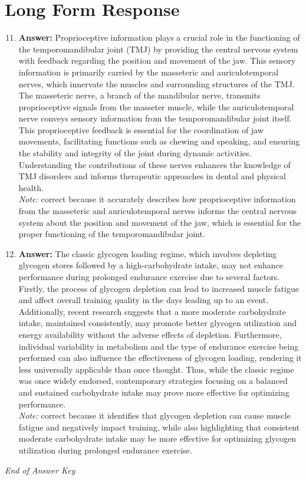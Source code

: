 \documentclass[12pt]{article}
\begin{document}
\section*{Long Form Response}
\begin{enumerate}[label=\arabic*.]
\setcounter{enumi}{10}
\item \textbf{Answer:} Proprioceptive information plays a crucial role in the functioning of the temporomandibular joint (TMJ) by providing the central nervous system with feedback regarding the position and movement of the jaw. This sensory information is primarily carried by the masseteric and auriculotemporal nerves, which innervate the muscles and surrounding structures of the TMJ. The masseteric nerve, a branch of the mandibular nerve, transmits proprioceptive signals from the masseter muscle, while the auriculotemporal nerve conveys sensory information from the temporomandibular joint itself. This proprioceptive feedback is essential for the coordination of jaw movements, facilitating functions such as chewing and speaking, and ensuring the stability and integrity of the joint during dynamic activities. Understanding the contributions of these nerves enhances the knowledge of TMJ disorders and informs therapeutic approaches in dental and physical health.
\\ \textit{Note:} correct because it accurately describes how proprioceptive information from the masseteric and auriculotemporal nerves informs the central nervous system about the position and movement of the jaw, which is essential for the proper functioning of the temporomandibular joint.
\item \textbf{Answer:} The classic glycogen loading regime, which involves depleting glycogen stores followed by a high-carbohydrate intake, may not enhance performance during prolonged endurance exercise due to several factors. Firstly, the process of glycogen depletion can lead to increased muscle fatigue and affect overall training quality in the days leading up to an event. Additionally, recent research suggests that a more moderate carbohydrate intake, maintained consistently, may promote better glycogen utilization and energy availability without the adverse effects of depletion. Furthermore, individual variability in metabolism and the type of endurance exercise being performed can also influence the effectiveness of glycogen loading, rendering it less universally applicable than once thought. Thus, while the classic regime was once widely endorsed, contemporary strategies focusing on a balanced and sustained carbohydrate intake may prove more effective for optimizing performance.
\\ \textit{Note:} correct because it identifies that glycogen depletion can cause muscle fatigue and negatively impact training, while also highlighting that consistent moderate carbohydrate intake may be more effective for optimizing glycogen utilization during prolonged endurance exercise.
\end{enumerate}

\vfill
\noindent\textit{End of Answer Key}
\end{document}
